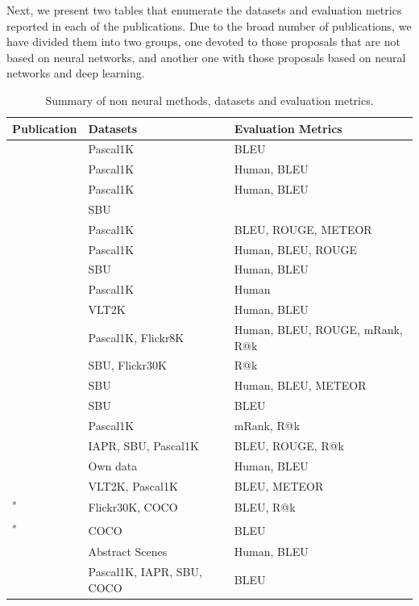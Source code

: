 
Next, we present two tables that enumerate the datasets and evaluation metrics reported in each of the publications. Due to the broad number of publications, we have divided them into two groups, one devoted to those proposals that are not based on neural networks, and another one with those proposals based on neural networks and deep learning.

\clearpage
\begin{table}[ht]
\caption{Summary of non neural methods, datasets and evaluation metrics.}
\begin{tabular}{p{} p{} p{}}
    \toprule
    Publication &  Datasets & Evaluation Metrics\\
    \midrule
    \citet{Farhadi2010} & Pascal1K & BLEU \\
    \citet{Kulkarni2011} & Pascal1K & Human, BLEU \\
    \citet{Li2011} & Pascal1K & Human, BLEU \\
    \citet{Ordonez2011} & SBU &  \\
    \citet{Yang2011} & Pascal1K & BLEU, ROUGE, METEOR \\
    \citet{Gupta2012} & Pascal1K & Human, BLEU, ROUGE \\
    \citet{Kuznetsova2012} & SBU & Human, BLEU \\
    \citet{Mitchell2012} & Pascal1K & Human \\
    \citet{Elliott2013} & VLT2K & Human, BLEU \\
    \citet{Hodosh2013b} & Pascal1K, Flickr8K & Human, BLEU, ROUGE, mRank, R@k \\
    \citet{Gong2014} & SBU, Flickr30K & R@k \\
    \citet{Kuznetsova2014} & SBU & Human, BLEU, METEOR \\
    \citet{Patterson2014} & SBU & BLEU \\
    \citet{Socher2014} & Pascal1K & mRank, R@k \\
    \citet{Verma2014} & IAPR, SBU, Pascal1K & BLEU, ROUGE, R@k \\
    \citet{Yatskar2014} & Own data & Human, BLEU \\
    \citet{Elliott2015} & VLT2K, Pascal1K & BLEU, METEOR \\
    \citet{Lebret2015a}\textsuperscript{*} & Flickr30K, COCO & BLEU, R@k \\
    \citet{Lebret2015b}\textsuperscript{*} & COCO & BLEU \\
    \citet{MateosOrtiz2015} & Abstract Scenes & Human, BLEU \\
    \citet{Ushiku2015} & Pascal1K, IAPR, SBU, COCO & BLEU \\
    \bottomrule
\end{tabular}
\label{tab:methods_datasets_metrics}
\end{table}

